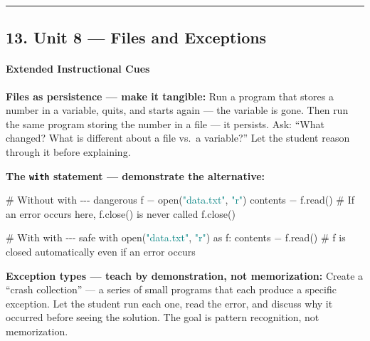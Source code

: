 \documentclass[
  justified,
  openright,
]{tufte-book}
\let\subsubsection\paragraph
\let\paragraph\paragraph
\newcommand{\BuiltInTok}[1]{#1}
\newcommand{\CommentTok}[1]{\textcolor{MidGray}{#1}}
\newcommand{\ControlFlowTok}[1]{\textcolor{BrandBlue}{#1}}
\newcommand{\ImportTok}[1]{\textcolor{BrandAccent}{#1}}
\newcommand{\NormalTok}[1]{#1}
\newcommand{\OperatorTok}[1]{\textcolor{DarkGray}{#1}}
\newcommand{\StringTok}[1]{\textcolor{Teal}{#1}}
\newenvironment{Shaded}{%
  \begin{snugshade}
}{%
  \end{snugshade}
}
\let\subsubsection\paragraph
\let\paragraph\paragraph
\begin{document}
\begin{center}\rule{0.5\linewidth}{0.5pt}\end{center}

\subsection{13. Unit 8 --- Files and
Exceptions}\label{unit-8-files-and-exceptions}

\subsubsection{Extended Instructional
Cues}\label{extended-instructional-cues-1}

\textbf{Files as persistence --- make it tangible:} Run a program that
stores a number in a variable, quits, and starts again --- the variable
is gone. Then run the same program storing the number in a file --- it
persists. Ask: ``What changed? What is different about a file vs.~a
variable?'' Let the student reason through it before explaining.

\textbf{The \texttt{with} statement --- demonstrate the alternative:}

\begin{Shaded}
\begin{Highlighting}[]
\CommentTok{\# Without \textquotesingle{}with\textquotesingle{} {-}{-}{-} dangerous}
\NormalTok{f }\OperatorTok{=} \BuiltInTok{open}\NormalTok{(}\StringTok{"data.txt"}\NormalTok{, }\StringTok{"r"}\NormalTok{)}
\NormalTok{contents }\OperatorTok{=}\NormalTok{ f.read()}
\CommentTok{\# If an error occurs here, f.close() is never called}
\NormalTok{f.close()}

\CommentTok{\# With \textquotesingle{}with\textquotesingle{} {-}{-}{-} safe}
\ControlFlowTok{with} \BuiltInTok{open}\NormalTok{(}\StringTok{"data.txt"}\NormalTok{, }\StringTok{"r"}\NormalTok{) }\ImportTok{as}\NormalTok{ f:}
\NormalTok{    contents }\OperatorTok{=}\NormalTok{ f.read()}
\CommentTok{\# f is closed automatically even if an error occurs}
\end{Highlighting}
\end{Shaded}

\textbf{Exception types --- teach by demonstration, not memorization:}
Create a ``crash collection'' --- a series of small programs that each
produce a specific exception. Let the student run each one, read the
error, and discuss why it occurred before seeing the solution. The goal
is pattern recognition, not memorization.
\end{document}
